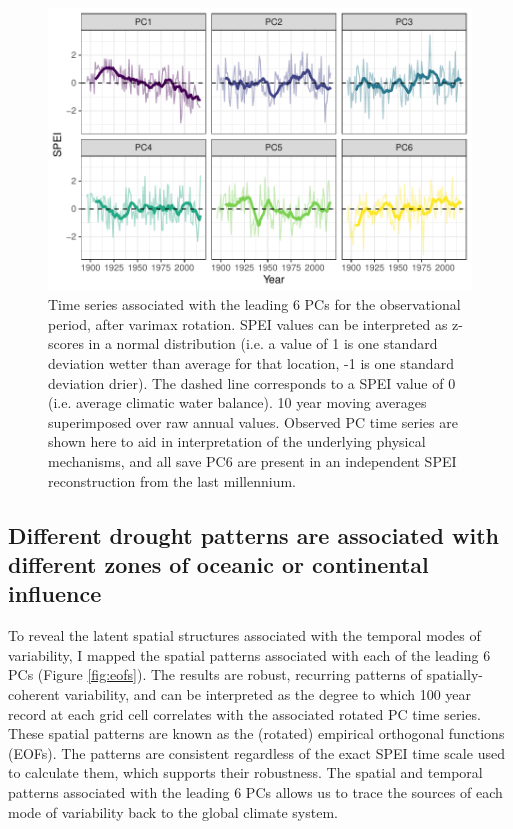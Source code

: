 \documentclass[10pt]{iopart}
\begin{document}
\begin{figure}[!htb]
\centering
\includegraphics[width=.9\linewidth]{figures/pc_obs.pdf}
\caption{Time series associated with the leading 6 PCs for the observational period, after varimax rotation. SPEI values can be interpreted as z-scores in a normal distribution (i.e. a value of 1 is one standard deviation wetter than average for that location, -1 is one standard deviation drier). The dashed line corresponds to a SPEI value of 0 (i.e. average climatic water balance). 10 year moving averages superimposed over raw annual values. Observed PC time series are shown here to aid in interpretation of the underlying physical mechanisms, and all save PC6 are present in an independent SPEI reconstruction from the last millennium.}
\label{fig:pc-obs}
\end{figure}

\subsection*{Different drought patterns are associated with different zones of oceanic or continental influence}
To reveal the latent spatial structures associated with the temporal modes of variability, I mapped the spatial patterns associated with each of the leading 6 PCs (Figure \ref{fig:eofs}). The results are robust, recurring patterns of spatially-coherent variability, and can be interpreted as the degree to which 100 year record at each grid cell correlates with the associated rotated PC time series. These spatial patterns are known as the (rotated) empirical orthogonal functions (EOFs). The patterns are consistent regardless of the exact SPEI time scale used to calculate them, which supports their robustness. The spatial and temporal patterns associated with the leading 6 PCs allows us to trace the sources of each mode of variability back to the global climate system.
\end{document}
